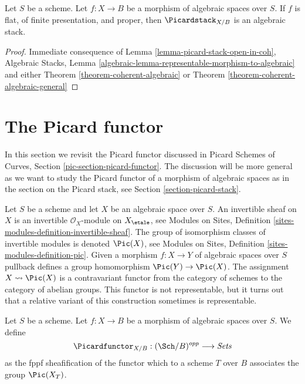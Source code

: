 \begin{proposition}
\label{proposition-pic}
Let $S$ be a scheme. Let $f : X \to B$ be a morphism of algebraic
spaces over $S$. If $f$ is flat, of finite presentation, and proper, then
$\Picardstack_{X/B}$ is an algebraic stack.
\end{proposition}

\begin{proof}
Immediate consequence of
Lemma \ref{lemma-picard-stack-open-in-coh},
Algebraic Stacks, Lemma
\ref{algebraic-lemma-representable-morphism-to-algebraic}
and either
Theorem \ref{theorem-coherent-algebraic}
or
Theorem \ref{theorem-coherent-algebraic-general}
\end{proof}








\section{The Picard functor}
\label{section-picard-functor}

\noindent
In this section we revisit the Picard functor discussed in
Picard Schemes of Curves, Section \ref{pic-section-picard-functor}.
The discussion will be more general as we want to study
the Picard functor of a morphism of algebraic spaces as in
the section on the Picard stack, see Section \ref{section-picard-stack}.

\medskip\noindent
Let $S$ be a scheme and let $X$ be an algebraic space over $S$.
An invertible sheaf on $X$ is an invertible $\mathcal{O}_X$-module
on $X_\etale$, see
Modules on Sites, Definition \ref{sites-modules-definition-invertible-sheaf}.
The group of isomorphism classes of invertible modules is denoted
$\Pic(X)$, see
Modules on Sites, Definition \ref{sites-modules-definition-pic}.
Given a morphism $f : X \to Y$ of algebraic spaces over $S$
pullback defines a group homomorphism $\Pic(Y) \to \Pic(X)$.
The assignment
$X \leadsto \Pic(X)$ is a contravariant functor from the category
of schemes to the category of abelian groups. This functor is not
representable, but it turns out that a relative variant of this
construction sometimes is representable.

\begin{situation}
\label{situation-pic}
Let $S$ be a scheme.
Let $f : X \to B$ be a morphism of algebraic spaces over $S$.
We define
$$
\Picardfunctor_{X/B} : (\Sch/B)^{opp} \longrightarrow \textit{Sets}
$$
as the fppf sheafification of the functor which to a scheme $T$
over $B$ associates the group $\Pic(X_T)$.
\end{situation}

